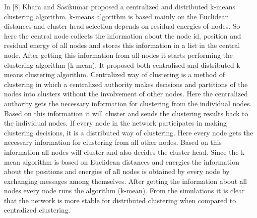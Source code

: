 \documentclass[MTech]{iitmdiss}
\begin{document}
In [8] Khara and Sasikumar proposed a centralized and  distributed k-means clustering algorithm. k-means algorithm is based mainly on the Euclidean  distances and cluster head selection depends on residual energies of nodes. So here the central node collects the  information about the node id, position and residual energy of  all nodes and stores this information in a list in the central 
node. After getting this information from all nodes it starts performing the clustering algorithm (k-mean). It proposed both centralised and distributed k-means clustering algorithm.
Centralized way of clustering is a method of clustering in which  a centralized authority makes decisions and partitions of  the nodes into clusters without the involvement of other nodes. Here the centralized authority  gets the necessary information for clustering from the 
individual nodes. Based on this information it will cluster  and sends the clustering results back to the individual nodes. If  every node in the network  participates in making clustering decisions, it is a distributed way of clustering. Here every node  gets the necessary information for clustering from all other  nodes. Based on this information all nodes will cluster and also decides the cluster head.
Since the k-mean algorithm  is based on Euclidean  distances and energies  the information about the positions and energies of all nodes is  obtained by every node by exchanging messages among  themselves. After getting the information about all nodes every  node runs the algorithm (k-mean). From the simulations  it is clear that the network is more stable for distributed clustering when compared to centralized clustering.
\end{document}
